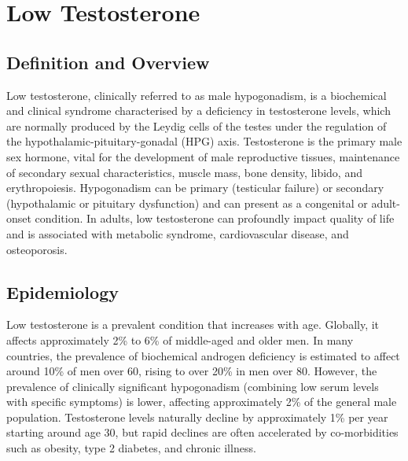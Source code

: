 \chapter{Low Testosterone}

\section*{Definition and Overview}
Low testosterone, clinically referred to as male hypogonadism, is a biochemical and clinical syndrome characterised by a deficiency in testosterone levels, which are normally produced by the Leydig cells of the testes under the regulation of the hypothalamic-pituitary-gonadal (HPG) axis. Testosterone is the primary male sex hormone, vital for the development of male reproductive tissues, maintenance of secondary sexual characteristics, muscle mass, bone density, libido, and erythropoiesis. Hypogonadism can be primary (testicular failure) or secondary (hypothalamic or pituitary dysfunction) and can present as a congenital or adult-onset condition. In adults, low testosterone can profoundly impact quality of life and is associated with metabolic syndrome, cardiovascular disease, and osteoporosis.

\section*{Epidemiology}
Low testosterone is a prevalent condition that increases with age. Globally, it affects approximately 2\% to 6\% of middle-aged and older men. In many countries, the prevalence of biochemical androgen deficiency is estimated to affect around 10\% of men over 60, rising to over 20\% in men over 80. However, the prevalence of clinically significant hypogonadism (combining low serum levels with specific symptoms) is lower, affecting approximately 2\% of the general male population. Testosterone levels naturally decline by approximately 1\% per year starting around age 30, but rapid declines are often accelerated by co-morbidities such as obesity, type 2 diabetes, and chronic illness.

